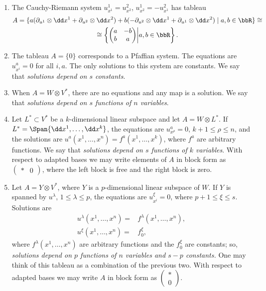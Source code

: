 \begin{example}\label{ex tableau}
    \begin{enumerate}
        \item The Cauchy-Riemann system $u^1_{x^1}=u^2_{x^2}$, $u^1_{x^2}=-u^2_{x^1}$ has tableau 
        \begin{multline}
            A=\{a(\partial_{u^1}\otimes\dd x^1+\partial_{u^2}\otimes\dd x^2)+b(-\partial_{u^2}\otimes \dd x^1+\partial_{u^1}\otimes\dd x^2)\mid a,b\in \bbR\}\cong\\
            \cong \left\{
                \begin{pmatrix}
                    a& -b\\b&a
                \end{pmatrix}\middle|a,b\in\bbR
            \right\}.
        \end{multline}
        \item  The tableau $A=\{0\}$ corresponds to a Pfaffian system. The equations are $u^a_{x^i}=0$ for all $i,a$. The only solutions to this system are constants. We say that \emph{solutions depend on $s$ constants}.
        \item When $A=W\otimes V^\ast$, there are no equations and any map is a solution. We say that \emph{solutions depend on $s$ functions of $n$ variables}.
        \item Let $L^\ast\subset V^\ast$ be a $k$-dimensional linear subspace and let $A=W\otimes L^\ast$. If $L^\ast=\Span\{\dd x^1,\ldots,\dd x^k\}$, the equations are $u^a_{x^\rho}=0$, $k+1\leq \rho\leq n$, and the solutions are $u^a(x^1,\ldots,x^n)=f^a(x^1,\ldots,x^k)$, where $f^a$ are arbitrary functions. We say that \emph{solutions depend on $s$ functions of $k$ variables}. With respect to adapted bases we may write elements of $A$ in block form as $\left(\begin{smallmatrix}
            *&0
        \end{smallmatrix}\right)$, where the left block is free and the right block is zero.
        \item Let $A=Y\otimes V^\ast$, where $Y$ is a $p$-dimensional linear subspace of $W$. If $Y$ is spanned by $u^\lambda$, $1\leq \lambda\leq p$, the equations are $u^\xi_{x^i}=0$, where $p+1\leq \xi\leq s$. Solutions are 
        \begin{align}
            u^\lambda(x^1,\ldots,x^n)=&f^\lambda(x^1,\ldots,x^n),\\
            u^\xi(x^1,\ldots,x^n)=&f^\xi_0,
        \end{align}
        where $f^\lambda(x^1,\ldots,x^n)$ are arbitrary functions and the $f_0^\xi$ are constants; so, \emph{solutions depend on $p$ functions of $n$ variables and $s-p$ constants.} One may think of this tableau as a combination of the previous two. With respect to adapted bases we may write $A$ in block form as $\left(\begin{smallmatrix}
            *\\0
        \end{smallmatrix}\right)$.
    \end{enumerate}
\end{example}


